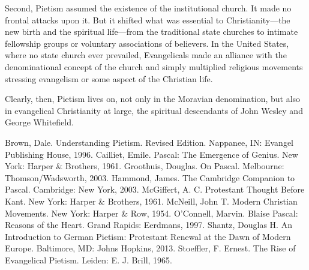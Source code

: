 Second, Pietism assumed the existence of the institutional church. It made no frontal attacks upon
it. But it shifted what was essential to Christianity—the new birth and the spiritual life—from the
traditional state churches to intimate fellowship groups or voluntary associations of believers. In
the United States, where no state church ever prevailed, Evangelicals made an alliance with the
denominational concept of the church and simply multiplied religious movements stressing evangelism
or some aspect of the Christian life.

Clearly, then, Pietism lives on, not only in the Moravian denomination, but also in evangelical
Christianity at large, the spiritual descendants of John Wesley and George Whitefield.

\begin{readinglist}
\entry Brown, Dale. Understanding Pietism. Revised Edition. Nappanee, IN: Evangel Publishing House,
  1996.
\entry Cailliet, Emile. Pascal: The Emergence of Genius. New York: Harper \& Brothers, 1961.
\entry Groothuis, Douglas. On Pascal. Melbourne: Thomson/Wadsworth, 2003.
\entry *Hammond, James. The Cambridge Companion to Pascal. Cambridge: New York, 2003.
\entry McGiffert, A. C. Protestant Thought Before Kant. New York: Harper \& Brothers, 1961.
\entry McNeill, John T. Modern Christian Movements. New York: Harper \& Row, 1954.
\entry *O’Connell, Marvin. Blaise Pascal: Reasons of the Heart. Grand Rapids: Eerdmans, 1997.
\entry *Shantz, Douglas H. An Introduction to German Pietism: Protestant Renewal at the Dawn of
  Modern Europe. Baltimore, MD: Johns Hopkins, 2013.
\entry Stoeffler, F. Ernest. The Rise of Evangelical Pietism. Leiden: E. J. Brill, 1965.
\end{readinglist}
